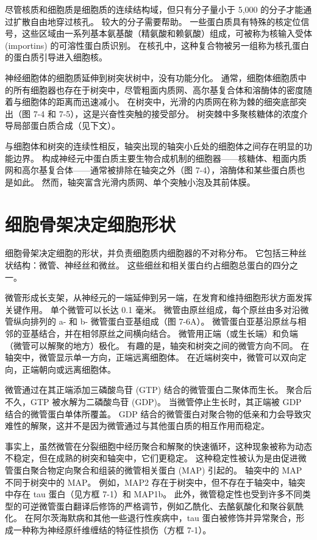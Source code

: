 尽管核质和细胞质是细胞质的连续结构域，但只有分子量小于 5,000 的分子才能通过扩散自由地穿过核孔。 较大的分子需要帮助。 一些蛋白质具有特殊的核定位信号，这些区域由一系列基本氨基酸（精氨酸和赖氨酸）组成，可被称为核输入受体 (importins) 的可溶性蛋白质识别。 在核孔中，这种复合物被另一组称为核孔蛋白的蛋白质引导进入细胞核。

神经细胞体的细胞质延伸到树突状树中，没有功能分化。 通常，细胞体细胞质中的所有细胞器也存在于树突中，尽管粗面内质网、高尔基复合体和溶酶体的密度随着与细胞体的距离而迅速减小。 在树突中，光滑的内质网在称为棘的细突底部突出（图 7-4 和 7-5），这是兴奋性突触的接受部分。 树突棘中多聚核糖体的浓度介导局部蛋白质合成（见下文）。

与细胞体和树突的连续性相反，轴突出现的轴突小丘处的细胞体之间存在明显的功能边界。 构成神经元中蛋白质主要生物合成机制的细胞器——核糖体、粗面内质网和高尔基复合体——通常被排除在轴突之外（图 7-4），溶酶体和某些蛋白质也是如此。 然而，轴突富含光滑内质网、单个突触小泡及其前体膜。


\section{细胞骨架决定细胞形状}
细胞骨架决定细胞的形状，并负责细胞质内细胞器的不对称分布。 它包括三种丝状结构：微管、神经丝和微丝。 这些细丝和相关蛋白约占细胞总蛋白的四分之一。

微管形成长支架，从神经元的一端延伸到另一端，在发育和维持细胞形状方面发挥关键作用。 单个微管可以长达 0.1 毫米。 微管由原丝组成，每个原丝由多对沿微管纵向排列的 a- 和 b- 微管蛋白亚基组成（图 7-6A）。 微管蛋白亚基沿原丝与相邻的亚基结合，并在相邻原丝之间横向结合。 微管用正端（或生长端）和负端（微管可以解聚的地方）极化。 有趣的是，轴突和树突之间的微管方向不同。 在轴突中，微管显示单一方向，正端远离细胞体。 在近端树突中，微管可以双向定向，正端朝向或远离细胞体。

微管通过在其正端添加三磷酸鸟苷 (GTP) 结合的微管蛋白二聚体而生长。 聚合后不久，GTP 被水解为二磷酸鸟苷 (GDP)。 当微管停止生长时，其正端被 GDP 结合的微管蛋白单体所覆盖。 GDP 结合的微管蛋白对聚合物的低亲和力会导致灾难性的解聚，这并不是因为微管通过与其他蛋白质的相互作用而稳定。

事实上，虽然微管在分裂细胞中经历聚合和解聚的快速循环，这种现象被称为动态不稳定，但在成熟的树突和轴突中，它们更稳定。 这种稳定性被认为是由促进微管蛋白聚合物定向聚合和组装的微管相关蛋白 (MAP) 引起的。 轴突中的 MAP 不同于树突中的 MAP。 例如，MAP2 存在于树突中，但不存在于轴突中，轴突中存在 tau 蛋白（见方框 7-1）和 MAP1b。 此外，微管稳定性也受到许多不同类型的可逆微管蛋白翻译后修饰的严格调节，例如乙酰化、去酪氨酸化和聚谷氨酰化。 在阿尔茨海默病和其他一些退行性疾病中，tau 蛋白被修饰并异常聚合，形成一种称为神经原纤维缠结的特征性损伤（方框 7-1）。

